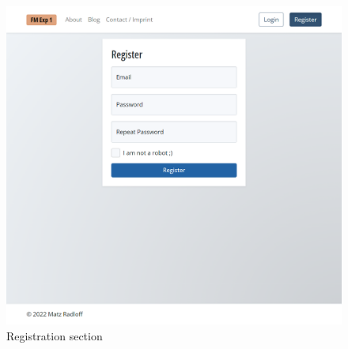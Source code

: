 \documentclass[
    fontsize=12pt,
    headings=small,
    parskip=half,           %
    bibliography=totoc,
    numbers=noenddot,       %
    open=any,               %
    final,                   %
    table
]{scrreprt}
\begin{document}
\begin{figure}[H]
    \includegraphics[width=\textwidth]{screenshots/fmexp1_register.png}
    \caption{Registration section}
    \label{screenshot:fmexp2}
\end{figure}
\end{document}
